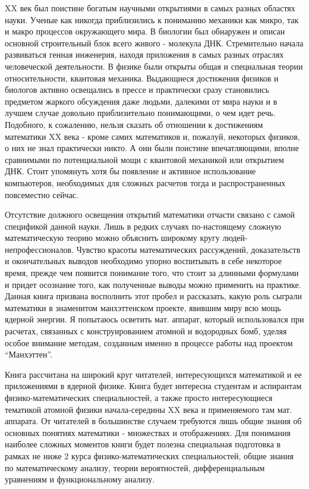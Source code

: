 XX век был поистине богатым научными открытиями в самых разных областях науки. Ученые как никогда приблизились к пониманию механики как микро, так и макро процессов окружающего мира. В биологии был обнаружен и описан основной строительный блок всего живого - молекула ДНК. Стремительно начала развиваться генная инженерия, находя приложения в самых разных отраслях человеческой деятельности. В физике были открыты общая и специальная теории относительности, квантовая механика. Выдающиеся достижения физиков и биологов активно освещались в прессе и практически сразу становились предметом жаркого обсуждения даже людьми, далекими от мира науки и в лучшем случае довольно приблизительно понимающими, о чем идет речь. 
Подобного, к сожалению, нельзя сказать об отношении к достижениям математики XX века - кроме самих математиков и, пожалуй, некоторых физиков, о них не знал практически никто. А они были поистине впечатляющими, вполне сравнимыми по потенциальной мощи с квантовой механикой или открытием ДНК. Стоит упомянуть хотя бы появление и активное использование компьютеров, необходимых для сложных расчетов тогда и распространенных повсеместно сейчас.

Отсутствие должного освещения открытий математики отчасти связано с самой спецификой данной науки. Лишь в редких случаях по-настоящему сложную математическую теорию можно объяснить широкому кругу людей-непрофессионалов. Чувство красоты математических рассуждений, доказательств и окончательных выводов необходимо упорно воспитывать в себе некоторое время, прежде чем появится понимание того, что стоит за длинными формулами и придет осознание того, как полученные выводы можно применить на практике.
Данная книга призвана восполнить этот пробел и рассказать, какую роль сыграли математики в знаменитом манхэттенском проекте, явившим миру всю мощь ядерной энергии. Я попытаюсь осветить мат. аппарат, который использовался при расчетах, связанных с конструированием атомной и водородных бомб, уделяя особое внимание методам, созданным именно в процессе работы над проектом “Манхэттен”.

Книга рассчитана на широкий круг читателей, интересующихся математикой и ее приложениями в ядерной физике. Книга будет интересна студентам и аспирантам физико-математических специальностей, а также просто интересующиеся тематикой атомной физики начала-середины XX века и применяемого там мат. аппарата. От читателей в большинстве случаем требуются лишь общие знания об основных понятиях математики - множествах и отображениях. Для понимания наиболее сложных моментов книги будет полезна специальная подготовка в рамках не ниже 2 курса физико-математических специальностей, общие знания по математическому анализу, теории вероятностей, дифференциальным уравнениям и функциональному анализу.






